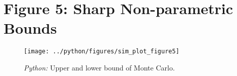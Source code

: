 \documentclass[11pt, a4paper, leqno]{article}
\begin{document}
\begin{table}[!h]
    
    \caption{\label{tab:fig3}}
\end{table}

\clearpage
\newpage

\section{Figure 5: Sharp Non-parametric Bounds}
\begin{figure}[H]

    \centering
    \texttt{[image: ../python/figures/sim\_plot\_figure5]}

    \caption{\emph{Python:} Upper and lower bound of Monte Carlo.}
    \label{fig:bounds_fig5}

\end{figure}

\begin{table}[!h]
    
    \caption{\label{tab:fig5}}
\end{table}



\printbibliography
{}



\end{document}
